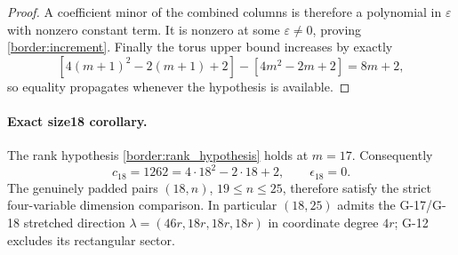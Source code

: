 \begin{proof}
A coefficient minor of the combined columns is therefore a
polynomial in $\varepsilon$ with nonzero constant term. It is
nonzero at some $\varepsilon\ne0$, proving
\eqref{border:increment}. Finally the torus upper bound increases
by exactly
\[
 [4(m+1)^2-2(m+1)+2]-[4m^2-2m+2]=8m+2,
\]
so equality propagates whenever the hypothesis is available.
\end{proof}

\paragraph{Exact size18 corollary.}
The rank hypothesis \eqref{border:rank_hypothesis} holds at $m=17$.
Consequently
\begin{equation}\label{R25:size18}
 c_{18}=1262=4\cdot18^2-2\cdot18+2,
 \qquad \epsilon_{18}=0.
\end{equation}
The genuinely padded pairs $(18,n)$, $19\leq n\leq25$, therefore
satisfy the strict four-variable dimension comparison. In
particular $(18,25)$ admits the G-17/G-18 stretched direction
$\lambda=(46r,18r,18r,18r)$ in coordinate degree $4r$; G-12
excludes its rectangular sector.

